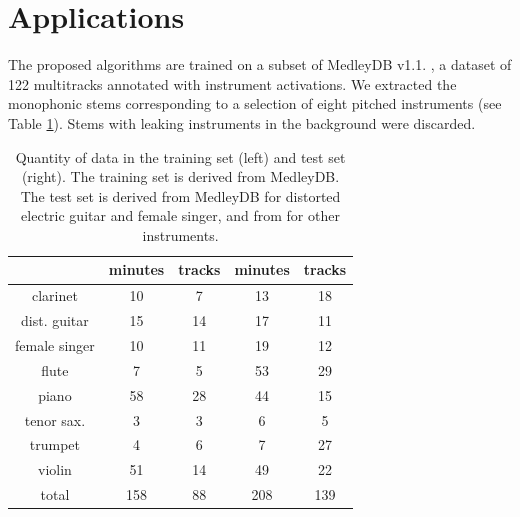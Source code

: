 \documentclass{article}
\begin{document}
\section{Applications}\label{sec:single-instrument}
The proposed algorithms are trained on a subset of MedleyDB v1.1. \cite{Bittner2014},
a dataset of 122 multitracks annotated with instrument activations. 
We extracted the monophonic stems corresponding to a selection of eight pitched
instruments (see Table \ref{table:single-label-durations}).
Stems with leaking instruments in the background were discarded.

\begin{table}
	\begin{center}
	\begin{tabular}{|c|cc|cc|}
		\hline
		& minutes & tracks & minutes & tracks \\
		\hline
		clarinet & 10 & 7 & 13 & 18 \\
		dist. guitar & 15 & 14 & 17 & 11 \\
		female singer & 10 & 11 & 19 & 12 \\
		flute & 7 & 5 & 53 & 29 \\
		piano & 58 & 28 & 44 & 15 \\
		tenor sax. & 3 & 3 & 6 & 5 \\
		trumpet & 4 & 6 & 7 & 27 \\
		violin & 51 & 14 & 49 & 22 \\
		\hline
		total & 158 & 88 & 208 & 139 \\
		\hline
	\end{tabular}
	\end{center}
	\caption{
	Quantity of data in the training set (left) and test set (right).
	The training set is derived from MedleyDB.
	The test set is derived from MedleyDB for distorted electric guitar and female singer,
	and from \cite{Joder2009} for other instruments.
	\label{table:single-label-durations}}
\end{table}
\end{document}
